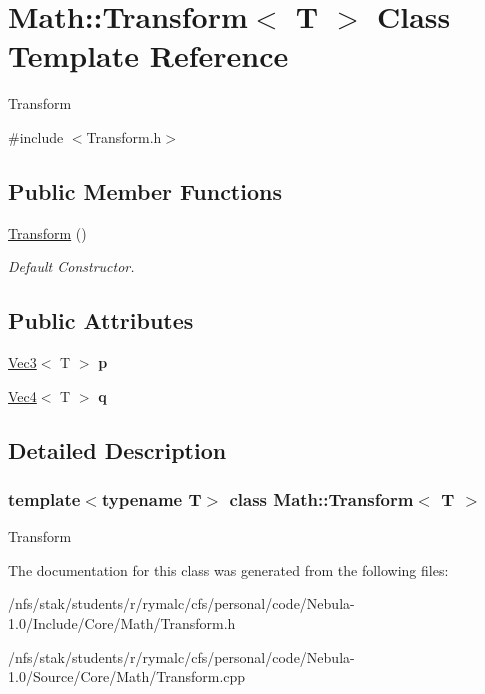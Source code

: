 \hypertarget{classMath_1_1Transform}{
\section{Math::Transform$<$ T $>$ Class Template Reference}
\label{classMath_1_1Transform}
}


Transform  


{\ttfamily \#include $<$Transform.h$>$}\subsection*{Public Member Functions}
\begin{DoxyCompactItemize}
\item 
\hypertarget{classMath_1_1Transform_a1c6fb8cd2f8d36e9abffc3964cbea8b7}{
\hyperlink{classMath_1_1Transform_a1c6fb8cd2f8d36e9abffc3964cbea8b7}{Transform} ()}
\label{classMath_1_1Transform_a1c6fb8cd2f8d36e9abffc3964cbea8b7}

\begin{DoxyCompactList}\small\item\em Default Constructor. \item\end{DoxyCompactList}\end{DoxyCompactItemize}
\subsection*{Public Attributes}
\begin{DoxyCompactItemize}
\item 
\hypertarget{classMath_1_1Transform_a956f3607e4e3839e3629cfc7dd765f53}{
\hyperlink{classMath_1_1Vec3}{Vec3}$<$ T $>$ {\bfseries p}}
\label{classMath_1_1Transform_a956f3607e4e3839e3629cfc7dd765f53}

\item 
\hypertarget{classMath_1_1Transform_a2d2e2b4506eafceeeb78b7ec74faf9eb}{
\hyperlink{classMath_1_1Vec4}{Vec4}$<$ T $>$ {\bfseries q}}
\label{classMath_1_1Transform_a2d2e2b4506eafceeeb78b7ec74faf9eb}

\end{DoxyCompactItemize}


\subsection{Detailed Description}
\subsubsection*{template$<$typename T$>$ class Math::Transform$<$ T $>$}

Transform 

The documentation for this class was generated from the following files:\begin{DoxyCompactItemize}
\item 
/nfs/stak/students/r/rymalc/cfs/personal/code/Nebula-\/1.0/Include/Core/Math/Transform.h\item 
/nfs/stak/students/r/rymalc/cfs/personal/code/Nebula-\/1.0/Source/Core/Math/Transform.cpp\end{DoxyCompactItemize}
